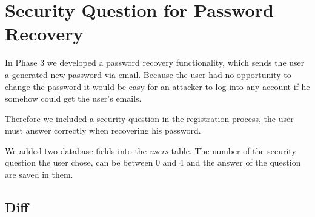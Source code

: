 \chapter{Security Question for Password Recovery}

In Phase 3 we developed a password recovery functionality, which sends the user a generated new password via email. Because the user had no opportunity to change the password it would be easy for an attacker to log into any account if he somehow could get the user's emails.

Therefore we included a security question in the registration process, the user must answer correctly when recovering his password.

We added two database fields into the \textit{users} table. The number of the security question the user chose, can be between 0 and 4 and the answer of the question are saved in them.

\section{Diff}

